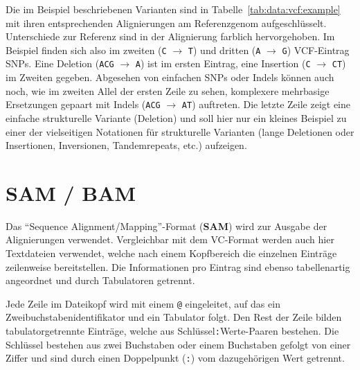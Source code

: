 Die im Beispiel beschriebenen Varianten sind in Tabelle~\ref{tab:data:vcf:example} mit ihren entsprechenden Alignierungen am Referenzgenom aufgeschlüsselt.
Unterschiede zur Referenz sind in der Alignierung farblich hervorgehoben.
Im Beispiel finden sich also im zweiten (\texttt{C} $\rightarrow$ \texttt{T}) und dritten (\texttt{A} $\rightarrow$ \texttt{G}) VCF-Eintrag SNPs.
Eine Deletion (\texttt{ACG} $\rightarrow$ \texttt{A}) ist im ersten Eintrag, eine Insertion (\texttt{C} $\rightarrow$ \texttt{CT}) im Zweiten gegeben.
Abgesehen von einfachen SNPs oder Indels können auch noch, wie im zweiten Allel der ersten Zeile zu sehen, komplexere mehrbasige Ersetzungen gepaart mit Indels (\texttt{ACG} $\rightarrow$ \texttt{AT}) auftreten.
Die letzte Zeile zeigt eine einfache strukturelle Variante (Deletion) und soll hier nur ein kleines Beispiel zu einer der vielseitigen Notationen für strukturelle Varianten (lange Deletionen oder Insertionen, Inversionen, Tandemrepeats, etc.) aufzeigen. 

\section{SAM / BAM}
\label{sec:data:sambam}
Das "`Sequence Alignment/Mapping"'-Format (\textbf{SAM}) wird zur Ausgabe der Alignierungen verwendet.
Vergleichbar mit dem VC-Format werden auch hier Textdateien verwendet, welche nach einem Kopfbereich die einzelnen Einträge zeilenweise bereitstellen.
Die Informationen pro Eintrag sind ebenso tabellenartig angeordnet und durch Tabulatoren getrennt.

Jede Zeile im Dateikopf wird mit einem \texttt{@} eingeleitet, auf das ein Zweibuchstabenidentifikator und ein Tabulator folgt.
Den Rest der Zeile bilden tabulatorgetrennte Einträge, welche aus Schlüssel\texttt{:}Werte-Paaren bestehen.
Die Schlüssel bestehen aus zwei Buchstaben oder einem Buchstaben gefolgt von einer Ziffer und sind durch einen Doppelpunkt (\texttt{:}) vom dazugehörigen Wert getrennt.

